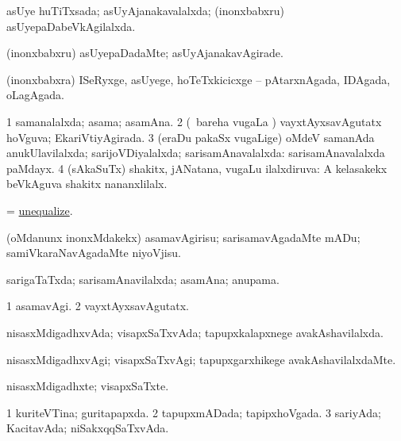\bentry
{} 
\gl{\gu}
\expl{}
\bmng
 asUye huTiTxsada; asUyAjanakavalalxda; (inonxbabxru) asUyepaDabeVkAgilalxda. 
\emng
\eentry

\bentry
{} 
\gl{\kirxvi}
\expl{}
\bmng
(inonxbabxru) asUyepaDadaMte; asUyAjanakavAgirade. 
\emng
\eentry

\bentry
{} 
\gl{\gu}
\bmng
 (inonxbabxra) ISeRyxge, asUyege, hoTeTxkicicxge -- pAtarxnAgada, IDAgada, oLagAgada. 
\emng
\eentry

\bentry
{} 
\gl{\gu}
\bmng
\bnum
\num{1} samanalalxda; asama; asamAna. 
\num{2} (\kanmu\ bareha \mo vugaLa \vi) vayxtAyxsavAgutatx hoVguva; EkariVtiyAgirada. 
\num{3} (eraDu pakaSx \mo vugaLige) oMdeV samanAda anukUlavilalxda; sarijoVDiyalalxda; sarisamAnavalalxda:  sarisamAnavalalxda paMdayx. 
\num{4} (sAkaSuTx) shakitx, jANatana, \mo vugaLu ilalxdiruva:  A kelasakekx beVkAguva shakitx nananxlilalx. 
\enum
\emng
\eentry

\bentry
{} 
\gl{\sakirx}
\expl{}
\bmng
 = \hyperlink{unequalize}{unequalize}. 
\emng
\eentry

\bentry
{} 
\gl{\sakirx}
\expl{}
\bmng
 (oMdanunx inonxMdakekx) asamavAgirisu; sarisamavAgadaMte mADu; samiVkaraNavAgadaMte niyoVjisu. 
\emng
\eentry

\bentry
{} 
\gl{\gu}
\expl{}
\bmng
 sarigaTaTxda; sarisamAnavilalxda; asamAna; anupama. 
\emng
\eentry

\bentry
{} 
\gl{\kirxvi}
\expl{}
\bmng
\bnum
\num{1} asamavAgi. 
\num{2} vayxtAyxsavAgutatx. 
\enum
\emng
\eentry

\bentry
{} 
\gl{\gu}
\expl{}
\bmng
 nisasxMdigadhxvAda; visapxSaTxvAda; tapupxkalapxnege avakAshavilalxda. 
\emng
\eentry

\bentry
{} 
\gl{\kirxvi}
\expl{}
\bmng
 nisasxMdigadhxvAgi; visapxSaTxvAgi; tapupxgarxhikege avakAshavilalxdaMte. 
\emng
\eentry

\bentry
{} 
\gl{\nA}
\expl{}
\bmng
 nisasxMdigadhxte; visapxSaTxte. 
\emng
\eentry

\bentry
{} 
\gl{\gu}
\bmng
\bnum
\num{1} kuriteVTina; guritapapxda. 
\num{2} tapupxmADada; tapipxhoVgada. 
\num{3} sariyAda; KacitavAda; niSakxqqSaTxvAda. 
\enum
\emng
\eentry


